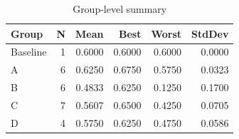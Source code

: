 \begin{table}[htbp]
\centering
\caption{Group-level summary}
\label{tab:group-summary}
\begin{tabular}{lrrrrr}
\toprule
\textbf{Group} & \textbf{N} & \textbf{Mean} & \textbf{Best} & \textbf{Worst} & \textbf{StdDev} \\
\midrule
Baseline & 1 & 0.6000 & 0.6000 & 0.6000 & 0.0000 \\
A & 6 & 0.6250 & 0.6750 & 0.5750 & 0.0323 \\
B & 6 & 0.4833 & 0.6250 & 0.1250 & 0.1700 \\
C & 7 & 0.5607 & 0.6500 & 0.4250 & 0.0705 \\
D & 4 & 0.5750 & 0.6250 & 0.4750 & 0.0586 \\
\bottomrule
\end{tabular}
\end{table}
